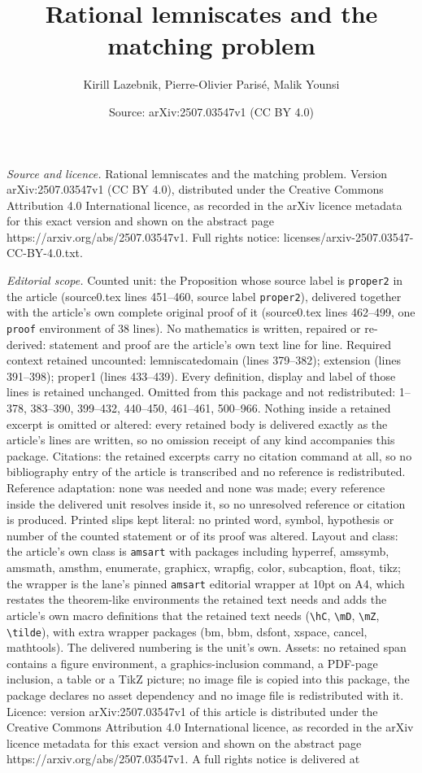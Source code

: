 \documentclass[10pt,a4paper]{amsart}
\title[Rational lemniscates and the matching problem]{Rational lemniscates and the matching problem}
\author{Kirill Lazebnik, Pierre-Olivier Paris\'e, Malik Younsi}
\date{Source: arXiv:2507.03547v1 (CC BY 4.0)}
\begin{document}
\maketitle

\noindent\emph{Source and licence.} Rational lemniscates and the matching problem. Version arXiv:2507.03547v1 (CC BY 4.0), distributed under the Creative Commons Attribution 4.0 International licence, as recorded in the arXiv licence metadata for this exact version and shown on the abstract page https://arxiv.org/abs/2507.03547v1. Full rights notice: licenses/arxiv-2507.03547-CC-BY-4.0.txt.\par\smallskip

\noindent\textit{Editorial scope.} Counted unit: the Proposition whose source label is \texttt{proper2} in the article (source0.tex lines 451--460, source label \texttt{proper2}), delivered together with the article's own complete original proof of it (source0.tex lines 462--499, one \texttt{proof} environment of 38 lines). No mathematics is written, repaired or re-derived: statement and proof are the article's own text line for line. Required context retained uncounted: lemniscatedomain (lines 379--382); extension (lines 391--398); proper1 (lines 433--439). Every definition, display and label of those lines is retained unchanged. Omitted from this package and not redistributed: 1--378, 383--390, 399--432, 440--450, 461--461, 500--966. Nothing inside a retained excerpt is omitted or altered: every retained body is delivered exactly as the article's lines are written, so no omission receipt of any kind accompanies this package. Citations: the retained excerpts carry no citation command at all, so no bibliography entry of the article is transcribed and no reference is redistributed. Reference adaptation: none was needed and none was made; every reference inside the delivered unit resolves inside it, so no unresolved reference or citation is produced. Printed slips kept literal: no printed word, symbol, hypothesis or number of the counted statement or of its proof was altered. Layout and class: the article's own class is \texttt{amsart} with packages including hyperref, amssymb, amsmath, amsthm, enumerate, graphicx, wrapfig, color, subcaption, float, tikz; the wrapper is the lane's pinned \texttt{amsart} editorial wrapper at 10pt on A4, which restates the theorem-like environments the retained text needs and adds the article's own macro definitions that the retained text needs (\texttt{\textbackslash hC}, \texttt{\textbackslash mD}, \texttt{\textbackslash mZ}, \texttt{\textbackslash tilde}), with extra wrapper packages (bm, bbm, dsfont, xspace, cancel, mathtools). The delivered numbering is the unit's own. Assets: no retained span contains a figure environment, a graphics-inclusion command, a PDF-page inclusion, a table or a TikZ picture; no image file is copied into this package, the package declares no asset dependency and no image file is redistributed with it. Licence: version arXiv:2507.03547v1 of this article is distributed under the Creative Commons Attribution 4.0 International licence, as recorded in the arXiv licence metadata for this exact version and shown on the abstract page https://arxiv.org/abs/2507.03547v1. A full rights notice is delivered at 
\end{document}
